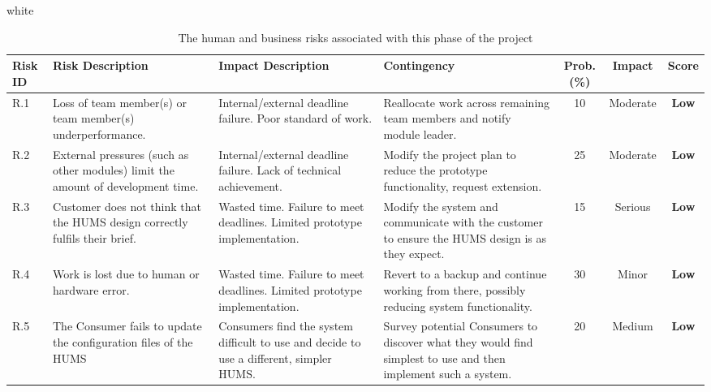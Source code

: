 \documentclass[10pt,a4paper]{article}
\newcommand{\tableformat}[4]{
\begin{table}[ht!]
\centering
  \rowcolors{2}{gray!10} {white}
\begin{tabular}{#1}
  \hline
  \rowcolor[gray]{0.9} #2
\end{tabular}
\caption{#3}
\label{#4}
\end{table}}
\begin{document}
\tableformat{p{0.8cm} p{3cm} p{3cm} p{3cm} c c c }
{ 	\hline
  	Risk ID & Risk Description & Impact Description & Contingency & Prob.(\%) & Impact & Score \\
  	\hline
  
    R.1 & Loss of team member(s) or team member(s) underperformance. & Internal/external deadline failure. Poor standard of work. & Reallocate work across remaining team members and notify module leader. & 10 & Moderate & \textbf{Low} \\
    R.2 & External pressures (such as other modules) limit the amount of development time. & Internal/external deadline failure. Lack of technical achievement. & Modify the project plan to reduce the prototype functionality, request extension. & 25 & Moderate &  \textbf{Low} \\
    R.3 & Customer does not think that the HUMS design correctly fulfils their brief. & Wasted time. Failure to meet deadlines. Limited prototype implementation. & Modify the system and communicate with the customer to ensure the HUMS design is as they expect. & 15 & Serious &  \textbf{Low} \\
    R.4 & Work is lost due to human or hardware error. & Wasted time. Failure to meet deadlines. Limited prototype implementation. & Revert to a backup and continue working from there, possibly reducing system functionality. & 30 & Minor &  \textbf{Low} \\
    R.5 & The Consumer fails to update the configuration files of the HUMS  & Consumers find the system difficult to use and decide to use a different, simpler HUMS. & Survey potential Consumers to discover what they would find simplest to use and then implement such a system. & 20 & Medium & \textbf{Low} \\	
  	\hline
}
{The human and business risks associated with this phase of the project}{tab:human_risks}
\end{document}
